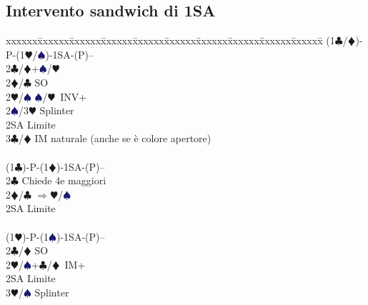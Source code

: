\documentclass[a4paper,italian]{article}
\newcommand{\BC}{\textcolor{OliveGreen}{$\clubsuit$}}
\newcommand{\BD}{\textcolor{RedOrange}{$\vardiamondsuit$}}
\newcommand{\BH}{\textcolor{Red2}{$\varheartsuit${}}}
\newcommand{\BS}{\textcolor{MidnightBlue}{$\spadesuit${}}}
\newenvironment{bidtable}
{\begin{tabbing}

    xxxxxx\=xxxxxx\=xxxxxx\=xxxxxx\=xxxxxx\=xxxxxx\=xxxxxx\=xxxxxx\=xxxxxx\=xxxxxx\=\kill}
{\end{tabbing} }%
\newenvironment{sviluppi}
{\begin{tcolorbox}[colframe=azzurro,title=Sviluppi particolari]}
    {
\end{tcolorbox} }%
\begin{document}
\begin{multicols}{2}
\begin{sviluppi}
                                        \end{sviluppi}
                                        \subsection{Intervento sandwich di 1SA}
                                        \begin{bidtable}
                                            (1\BC/\BD)-P-(1\BH/\BS)-1SA-(P)--\+\\
                                            2\BC/\BD{}+\BS/\BH\\
                                            2\BD/\BC\> SO\\
                                            2\BH/\BS{} \BS/\BH\ INV+\\
                                            2\BS/3\BH\> Splinter\\
                                            2SA\> Limite\\
                                            3\BC/\BD\> IM naturale (anche se è colore apertore)\-\\
                                        \\
                                        (1\BC)-P-(1\BD)-1SA-(P)--\+\\
                                        2\BC\> Chiede 4e maggiori\\
                                        2\BD/\BC\> $\Rightarrow$\BH/\BS\\
                                        2SA\> Limite\-\\
                                        \\
                                        (1\BH)-P-(1\BS)-1SA-(P)--\+\\
                                        2\BC/\BD\> SO\\
                                        2\BH/\BS{}+\BC/\BD\ IM+\\
                                        2SA\> Limite\\
                                        3\BH/\BS\> Splinter\\
                                        \\
                                        \\

                                    \end{bidtable}
                                    

                                    \end{multicols}
                                
\end{document}

